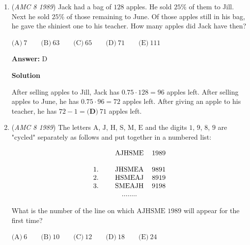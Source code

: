 \begin{enumerate}
 \textbf{Answer: }D



\textbf{Solution}

The highest sum of three different numbers on this cube is $4 + 5 + 6 = 15$. But $4$ and $6$ are on opposite faces, so the faces labeled $4$, $5$, and $6$ will not meet at a corner.

 The next highest sum of three different numbers on this cube is $3 + 5 + 6 = 14$.  These faces meet at a corner, so the answer is $\boxed{\textbf{(D)}\ 14}$.

 


	\item (\textit{AMC 8 1989}) Jack had a bag of $128$ apples.  He sold $25\%$ of them to Jill.  Next he sold $25\%$ of those remaining to June.  Of those apples still in his bag, he gave the shiniest one to his teacher.  How many apples did Jack have then?


 $\text{(A)}\ 7 \qquad \text{(B)}\ 63 \qquad \text{(C)}\ 65 \qquad \text{(D)}\ 71 \qquad \text{(E)}\ 111$

 \textbf{Answer: }D



\textbf{Solution}

After selling apples to Jill, Jack has $0.75 \cdot 128 = 96$ apples left.  After selling apples to June, he has $0.75 \cdot 96 = 72$ apples left.  After giving an apple to his teacher, he has $72 - 1 = \boxed{\textbf{(D)}\ 71}$ apples left.

 


	\item (\textit{AMC 8 1989}) The letters $\text{A}$, $\text{J}$, $\text{H}$, $\text{S}$, $\text{M}$, $\text{E}$ and the digits $1$, $9$, $8$, $9$ are "cycled" separately as follows and put together in a numbered list:

 \[\begin{tabular}[t]{lccc}  & & AJHSME & 1989 \\  & & & \\ 1. & & JHSMEA & 9891 \\ 2. & & HSMEAJ & 8919 \\ 3. & & SMEAJH & 9198 \\  & & ........ &  \end{tabular}\]


 What is the number of the line on which $\text{AJHSME 1989}$ will appear for the first time?


 $\text{(A)}\ 6 \qquad \text{(B)}\ 10 \qquad \text{(C)}\ 12 \qquad \text{(D)}\ 18 \qquad \text{(E)}\ 24$


\end{enumerate}
